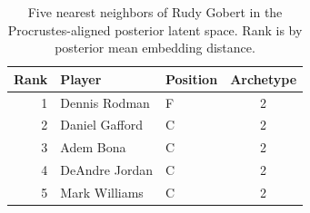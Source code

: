 \begin{table}[htbp]
  \centering\small
  \begin{tabular}{rllc}
    \toprule
    Rank & Player & Position & Archetype \\
    \midrule
    1 & Dennis Rodman & F & 2 \\
    2 & Daniel Gafford & C & 2 \\
    3 & Adem Bona & C & 2 \\
    4 & DeAndre Jordan & C & 2 \\
    5 & Mark Williams & C & 2 \\
    \bottomrule
  \end{tabular}
  \caption{Five nearest neighbors of Rudy Gobert in the Procrustes-aligned posterior latent space. Rank is by posterior mean embedding distance.}
  \label{tab:Rudy_Gobert_neighbors}
\end{table}

